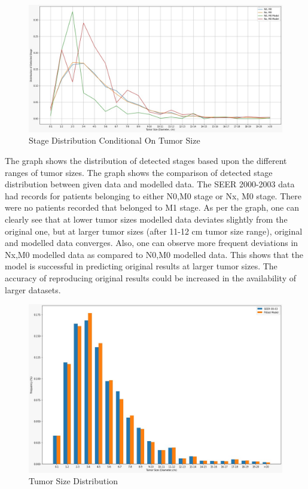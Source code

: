 \documentclass{article}
\begin{document}
\begin{enumerate}
		\begin{figure}[H]
			\centerline{\includegraphics[scale=.25]{3.jpeg}}
			\caption{Stage Distribution Conditional On Tumor Size}		
		\end{figure}
	The graph shows the distribution of detected stages based upon the different ranges of tumor sizes. The graph shows the comparison of detected stage distribution between given data and modelled data. The SEER 2000-2003 data had records for patients belonging to either N0,M0 stage or Nx, M0 stage. There were no patients recorded that belonged to M1 stage. As per the graph, one can clearly see that at lower tumor sizes modelled data deviates slightly from the original one, but at larger tumor sizes (after 11-12 cm tumor size range), original and modelled data converges. Also, one can observe more frequent deviations in Nx,M0 modelled data as compared to N0,M0 modelled data. This shows that the model is successful in predicting original results at larger tumor sizes. The accuracy of reproducing original results could be increased in the availability of larger datasets.



	
	
	\begin{figure}[H]
		\centerline{\includegraphics[scale=.35]{4.jpeg}}
		\caption{Tumor Size Distribution}		
	\end{figure}


\end{enumerate}
\end{document}
